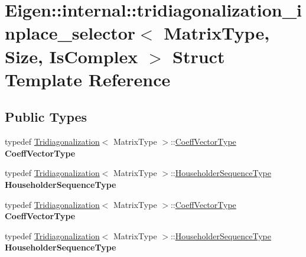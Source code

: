 \hypertarget{struct_eigen_1_1internal_1_1tridiagonalization__inplace__selector}{}\section{Eigen\+:\+:internal\+:\+:tridiagonalization\+\_\+inplace\+\_\+selector$<$ Matrix\+Type, Size, Is\+Complex $>$ Struct Template Reference}
\label{struct_eigen_1_1internal_1_1tridiagonalization__inplace__selector}
\subsection*{Public Types}
\begin{DoxyCompactItemize}
\item 
\mbox{\label{struct_eigen_1_1internal_1_1tridiagonalization__inplace__selector_aa0c24c9b9d075d1c4f325e54c1bfa792}} 
typedef \hyperlink{group___eigenvalues___module_class_eigen_1_1_tridiagonalization}{Tridiagonalization}$<$ Matrix\+Type $>$\+::\hyperlink{group___core___module}{Coeff\+Vector\+Type} {\bfseries Coeff\+Vector\+Type}
\item 
\mbox{\label{struct_eigen_1_1internal_1_1tridiagonalization__inplace__selector_ac2ca4228fbc0d2ddcc22af399326b6c4}} 
typedef \hyperlink{group___eigenvalues___module_class_eigen_1_1_tridiagonalization}{Tridiagonalization}$<$ Matrix\+Type $>$\+::\hyperlink{group___householder___module_class_eigen_1_1_householder_sequence}{Householder\+Sequence\+Type} {\bfseries Householder\+Sequence\+Type}
\item 
\mbox{\label{struct_eigen_1_1internal_1_1tridiagonalization__inplace__selector_aa0c24c9b9d075d1c4f325e54c1bfa792}} 
typedef \hyperlink{group___eigenvalues___module_class_eigen_1_1_tridiagonalization}{Tridiagonalization}$<$ Matrix\+Type $>$\+::\hyperlink{group___core___module}{Coeff\+Vector\+Type} {\bfseries Coeff\+Vector\+Type}
\item 
\mbox{\label{struct_eigen_1_1internal_1_1tridiagonalization__inplace__selector_ac2ca4228fbc0d2ddcc22af399326b6c4}} 
typedef \hyperlink{group___eigenvalues___module_class_eigen_1_1_tridiagonalization}{Tridiagonalization}$<$ Matrix\+Type $>$\+::\hyperlink{group___householder___module_class_eigen_1_1_householder_sequence}{Householder\+Sequence\+Type} {\bfseries Householder\+Sequence\+Type}
\end{DoxyCompactItemize}
